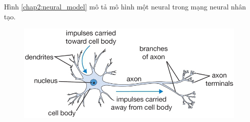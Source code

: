 Hình \ref{chap2:neural_model} mô tả mô hình một neural trong mạng neural nhân tạo.
\begin{center}
    \begin{figure}[H]
    \centering
    \includegraphics[width=0.6\columnwidth]{images/chap2/neuron.png}
    \label{chap2:animal_neural}
    \end{figure}
\end{center}



